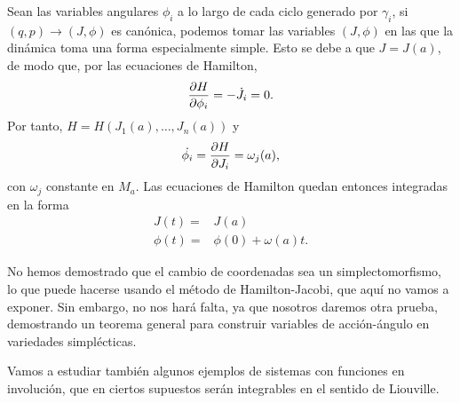 \begin{ejemplo}
Sean las variables angulares $\phi_i$ a lo largo de cada ciclo generado por $\gamma_i$, si $(q,p) \rightarrow (J,\phi)$ es canónica, podemos tomar las variables $(J,\phi)$ en las que la dinámica toma una forma especialmente simple. Esto se debe a que $J=J(a)$, de modo que, por las ecuaciones de Hamilton, 
\begin{equation*}
  \frac{\partial H}{\partial \phi_i}=-\dot{J_i}=0.
\end{equation*}
Por tanto, $H=H(J_1(a),\dots,J_n(a))$ y 
\begin{equation*}
  \dot{\phi_i}=\frac{\partial H}{\partial J_i} = \omega_j(a),
\end{equation*}
con $\omega_j$ constante en $M_a$. Las ecuaciones de Hamilton quedan entonces integradas en la forma
\begin{align*}
  J(t)= & J(a) \\
  \phi(t) = & \phi(0) + \omega(a) t.
\end{align*}

No hemos demostrado que el cambio de coordenadas sea un simplectomorfismo, lo que puede hacerse usando el método de Hamilton-Jacobi, que aquí no vamos a exponer. Sin embargo, no nos hará falta, ya que nosotros daremos otra prueba, demostrando un teorema general para construir variables de acción-ángulo en variedades simplécticas.
\end{ejemplo}

Vamos a estudiar también algunos ejemplos de sistemas con funciones en involución, que en ciertos supuestos serán integrables en el sentido de Liouville.
  
